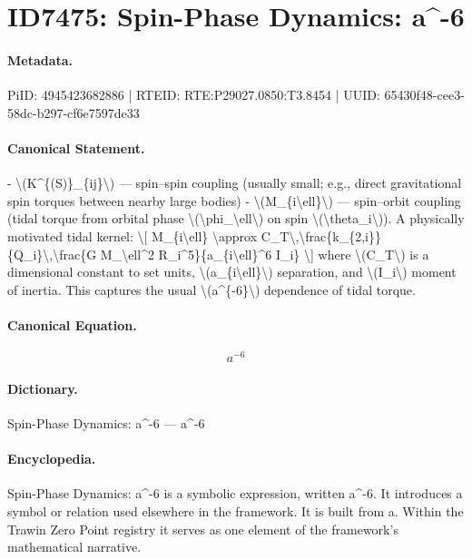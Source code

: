 \section*{ID7475: Spin-Phase Dynamics: a\textasciicircum{}-6}
\paragraph{Metadata.}
PiID: 4945423682886 | RTEID: RTE:P29027.0850:T3.8454 | UUID: 65430f48-cee3-58dc-b297-cf6e7597de33

\paragraph{Canonical Statement.}
- \textbackslash{}(K\textasciicircum{}\{(S)\}\_\{ij\}\textbackslash{}) — spin–spin coupling (usually small; e.g., direct gravitational spin torques between nearby large bodies) - \textbackslash{}(M\_\{i\textbackslash{}ell\}\textbackslash{}) — spin–orbit coupling (tidal torque from orbital phase \textbackslash{}(\textbackslash{}phi\_\textbackslash{}ell\textbackslash{}) on spin \textbackslash{}(\textbackslash{}theta\_i\textbackslash{})). A physically motivated tidal kernel: \textbackslash{}[ M\_\{i\textbackslash{}ell\} \textbackslash{}approx C\_T\textbackslash{},\textbackslash{}frac\{k\_\{2,i\}\}\{Q\_i\}\textbackslash{},\textbackslash{}frac\{G M\_\textbackslash{}ell\textasciicircum{}2 R\_i\textasciicircum{}5\}\{a\_\{i\textbackslash{}ell\}\textasciicircum{}6 I\_i\} \textbackslash{}] where \textbackslash{}(C\_T\textbackslash{}) is a dimensional constant to set units, \textbackslash{}(a\_\{i\textbackslash{}ell\}\textbackslash{}) separation, and \textbackslash{}(I\_i\textbackslash{}) moment of inertia. This captures the usual \textbackslash{}(a\textasciicircum{}\{-6\}\textbackslash{}) dependence of tidal torque.

\paragraph{Canonical Equation.}
\[
a^{-6}
\]

\paragraph{Dictionary.}
Spin-Phase Dynamics: a\textasciicircum{}-6 — a\textasciicircum{}-6

\paragraph{Encyclopedia.}
Spin-Phase Dynamics: a\textasciicircum{}-6 is a symbolic expression, written a\textasciicircum{}-6. It introduces a symbol or relation used elsewhere in the framework. It is built from a. Within the Trawin Zero Point registry it serves as one element of the framework's mathematical narrative.
